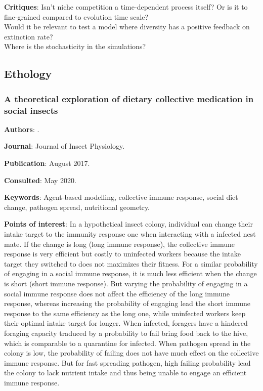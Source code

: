 \documentclass[12pt,a4paper]{article}
\begin{document}
\textbf{Critiques}: Isn't niche competition a time-dependent process itself? Or is it to fine-grained compared to evolution time scale?\\
Would it be relevant to test a model where diversity has a positive feedback on extinction rate?\\
Where is the stochasticity in the simulations?

\newpage

\subsection*{Ethology}

\subsubsection*{A theoretical exploration of dietary collective medication in social insects}

\textbf{Authors}: \cite{POISSONNIER201878}.

\textbf{Journal}: Journal of Insect Physiology.

\textbf{Publication}: August 2017.

\textbf{Consulted}: May 2020.

\textbf{Keywords}: Agent-based modelling, collective immune response, social diet change, pathogen spread, nutritional geometry.

\textbf{Points of interest}: In a hypothetical insect colony, individual can change their intake target to the immunity response one when interacting with a infected nest mate. If the change is long (long immune response), the collective immune response is very efficient but costly to uninfected workers because the intake target they switched to does not maximizes their fitness. For a similar probability of engaging in a social immune response, it is much less efficient when the change is short (short immune response). But varying the probability of engaging in a social immune response does not affect the efficiency of the long immune response, whereas increasing the probability of engaging lead the short immune response to the same efficiency as the long one, while uninfected workers keep their optimal intake target for longer.
When infected, foragers have a hindered foraging capacity traduced by a probability to fail bring food back to the hive, which is comparable to a quarantine for infected. When pathogen spread in the colony is low, the probability of failing does not have much effect on the collective immune response. But for fast spreading pathogen, high failing probability lead the colony to lack nutrient intake and thus being unable to engage an efficient immune response.
\end{document}
